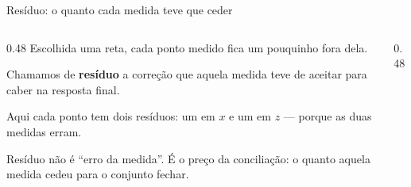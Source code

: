 \documentclass[aspectratio=169,11pt]{beamer}
\newcommand{\bnum}[1]{\textbf{\textcolor{mTeal}{#1}}}
\begin{document}
\begin{frame}{Resíduo: o quanto cada medida teve que ceder}
  \begin{columns}[c]
    \begin{column}{0.48\textwidth}
      Escolhida uma reta, cada ponto medido fica um pouquinho fora dela.
      \medskip

      Chamamos de \bnum{resíduo} a correção que aquela medida teve de aceitar para
      caber na resposta final.
      \medskip

      Aqui cada ponto tem \alert{dois} resíduos: um em $x$ e um em $z$ --- porque as
      duas medidas erram.
      \medskip

      {\small\textcolor{mStoneMid}{Resíduo não é ``erro da medida''. É o preço da
      conciliação: o quanto aquela medida cedeu para o conjunto fechar.}}
    \end{column}
    \begin{column}{0.48\textwidth}
      \centering
    \end{column}
  \end{columns}
\end{frame}
\end{document}
